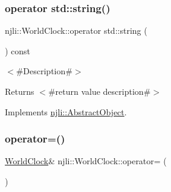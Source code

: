 \mbox{\label{classnjli_1_1_world_clock_a0ebeaf0636f48e20734bf05dee514ff3}} 
\subsubsection{\texorpdfstring{operator std\+::string()}{operator std::string()}}
{\footnotesize\ttfamily njli\+::\+World\+Clock\+::operator std\+::string (\begin{DoxyParamCaption}{ }\end{DoxyParamCaption}) const\hspace{0.3cm}{\ttfamily [virtual]}}

$<$\#\+Description\#$>$

\begin{DoxyReturn}{Returns}
$<$\#return value description\#$>$ 
\end{DoxyReturn}


Implements \mbox{\hyperlink{classnjli_1_1_abstract_object_afc07f4138bd3003910e7aa7fa0fe11ad}{njli\+::\+Abstract\+Object}}.

\mbox{\label{classnjli_1_1_world_clock_a4e158b42fd4835209dce260ffe490420}} 
\subsubsection{\texorpdfstring{operator=()}{operator=()}}
{\footnotesize\ttfamily \mbox{\hyperlink{classnjli_1_1_world_clock}{World\+Clock}}\& njli\+::\+World\+Clock\+::operator= (\begin{DoxyParamCaption}\item[{const \mbox{\hyperlink{classnjli_1_1_world_clock}{World\+Clock}} \&}]{ }\end{DoxyParamCaption})\hspace{0.3cm}{\ttfamily [private]}}

\mbox{\label{classnjli_1_1_world_clock_a087eb5f8d9f51cc476f12f1d10a3cb95}} 
